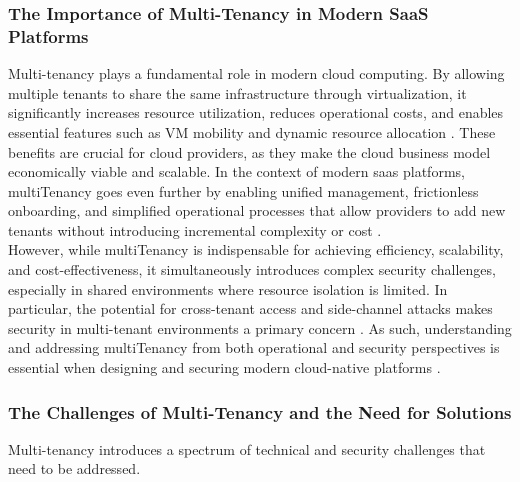 \documentclass[11pt, a4paper, oneside, listof=totoc]{scrartcl}
\begin{document}
            \subsubsection{The Importance of Multi-Tenancy in Modern SaaS Platforms}\label{subsubsec:mtImportance}
                Multi-tenancy plays a fundamental role in modern cloud computing.
                By allowing multiple tenants to share the same infrastructure through
                virtualization, it significantly increases resource utilization, reduces operational
                costs, and enables essential features such as VM mobility and dynamic resource
                allocation \parencite[pp.~345--346]{aljahdali2014}. 
                These benefits are crucial for cloud providers, as they make the cloud business
                model economically viable and scalable.
                In the context of modern \gls{saas} platforms, \gls{multiTenancy} goes even further
                by enabling unified management, frictionless onboarding, and simplified operational
                processes that allow providers to add new tenants without introducing incremental
                complexity or cost \parencite[pp.~9--11]{awsSaaSArchitectureFundamentals}.
                \\
                However, while \gls{multiTenancy} is indispensable for achieving efficiency,
                scalability, and cost-effectiveness, it simultaneously introduces complex security
                challenges, especially in shared environments where resource isolation is limited. 
                In particular, the potential for cross-tenant access and side-channel attacks makes
                security in multi-tenant environments a primary concern
                \parencite[pp.~345--346]{aljahdali2014}. 
                As such, understanding and addressing \gls{multiTenancy} from both operational and
                security perspectives is essential when designing and securing modern cloud-native
                platforms
                \parencites[pp.~9--11]{awsSaaSArchitectureFundamentals}[p.~4]{isoConcepts}.

            \subsubsection{The Challenges of Multi-Tenancy and the Need for Solutions}\label{subsubsec:challenges}
                Multi-tenancy introduces a spectrum of technical and security challenges that need
                to be addressed.
\end{document}
